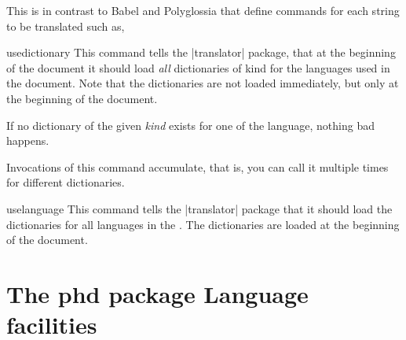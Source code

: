 This is in contrast to Babel and Polyglossia that define
commands for each string to be translated such as,

\begin{teXXX}
\def\captionsdutch{%
    \def\prefacename{Voorwoord}%
    \def\refname{Referenties}%
    \def\abstractname{Samenvatting}%
    \def\bibname{Bibliografie}%
    \def\chaptername{Hoofdstuk}%
    \def\appendixname{Bijlage}%
    \def\contentsname{Inhoudsopgave}%
    \def\listfigurename{Lijst van figuren}%
    \def\listtablename{Lijst van tabellen}%
    \def\indexname{Index}%
    \def\figurename{Figuur}%
    \def\tablename{Tabel}%
    \def\partname{Deel}%
    \def\enclname{Bijlage(n)}%
    \def\ccname{cc}%
    \def\headtoname{Aan}%
    \def\pagename{Pagina}%
    \def\seename{zie}%
    \def\alsoname{zie ook}%
    \def\proofname{Bewijs}%
    \def\glossaryname{Verklarende woordenlijst}%
    \def\today{\number\day~\ifcase\month%
      \or januari\or februari\or maart\or april\or mei\or juni\or
      juli\or augustus\or september\or oktober\or november\or
      december\fi
      \space \number\year}}
\end{teXXX}

\begin{docCommand}{usedictionary}{}
  This command tells the |translator| package, that at the beginning of
  the document it should load \textit{all} dictionaries of kind  for
  the languages used in the document. Note that the dictionaries are
  not loaded immediately, but only at the beginning of the document.

  If no dictionary of the given \emph{kind} exists for one of the
  language, nothing bad happens.

  Invocations of this command accumulate, that is, you can call it
  multiple times for different dictionaries.
\end{docCommand}

\begin{docCommand}{uselanguage}{}
  This command tells the |translator| package that it should load the
  dictionaries for all languages in the . The
  dictionaries are loaded at the beginning of the document.
\end{docCommand}

\section{The phd package Language facilities}

